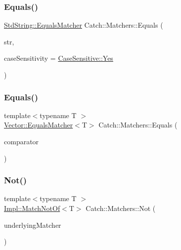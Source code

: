 \subsubsection{\texorpdfstring{Equals()}{Equals()}\hspace{0.1cm}{\footnotesize\ttfamily [1/2]}}
{\footnotesize\ttfamily \hyperlink{struct_catch_1_1_matchers_1_1_std_string_1_1_equals_matcher}{Std\+String\+::\+Equals\+Matcher} Catch\+::\+Matchers\+::\+Equals (\begin{DoxyParamCaption}\item[{\textbf{ std\+::string} const \&}]{str,  }\item[{\hyperlink{struct_catch_1_1_case_sensitive_aad49d3aee2d97066642fffa919685c6a}{Case\+Sensitive\+::\+Choice}}]{case\+Sensitivity = {\ttfamily \hyperlink{struct_catch_1_1_case_sensitive_aad49d3aee2d97066642fffa919685c6aa7c5550b69ec3c502e6f609b67f9613c6}{Case\+Sensitive\+::\+Yes}} }\end{DoxyParamCaption})}

\mbox{\label{namespace_catch_1_1_matchers_a332a401fb0da33c988e9cfa400ecce1b}} 
\subsubsection{\texorpdfstring{Equals()}{Equals()}\hspace{0.1cm}{\footnotesize\ttfamily [2/2]}}
{\footnotesize\ttfamily template$<$typename T $>$ \\
\hyperlink{struct_catch_1_1_matchers_1_1_vector_1_1_equals_matcher}{Vector\+::\+Equals\+Matcher}$<$T$>$ Catch\+::\+Matchers\+::\+Equals (\begin{DoxyParamCaption}\item[{\textbf{ std\+::vector}$<$ T $>$ const \&}]{comparator }\end{DoxyParamCaption})}

\mbox{\label{namespace_catch_1_1_matchers_acd3369efa3f62ffa1269df4b8ddf8134}} 
\subsubsection{\texorpdfstring{Not()}{Not()}}
{\footnotesize\ttfamily template$<$typename T $>$ \\
\hyperlink{struct_catch_1_1_matchers_1_1_impl_1_1_match_not_of}{Impl\+::\+Match\+Not\+Of}$<$T$>$ Catch\+::\+Matchers\+::\+Not (\begin{DoxyParamCaption}\item[{\hyperlink{struct_catch_1_1_matchers_1_1_impl_1_1_matcher_base}{Impl\+::\+Matcher\+Base}$<$ T $>$ const \&}]{underlying\+Matcher }\end{DoxyParamCaption})\hspace{0.3cm}{\ttfamily [inline]}}


